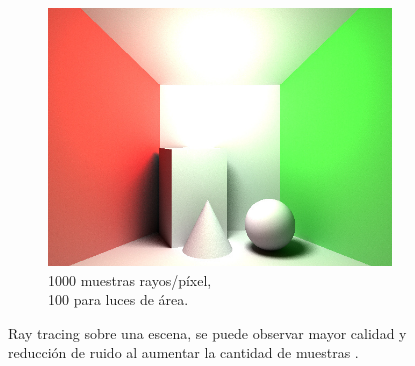 \begin{figure}[H]
	\begin{subfigure}{0.33\textwidth}
		\centering
		\includegraphics[width=.98\linewidth]{media/ray_1000s.jpg}
		\captionsetup{width=0.98\textwidth, justification=centering}
		\caption*{1000 muestras rayos/píxel,\\ 100 para luces de área.}
	\end{subfigure}
	\caption{Ray tracing sobre una escena, se puede observar mayor calidad y reducción de ruido al aumentar la cantidad de muestras \cite{locdoraytracing}.}
	\label{fig:ray_tracing_nsamples}
\end{figure}